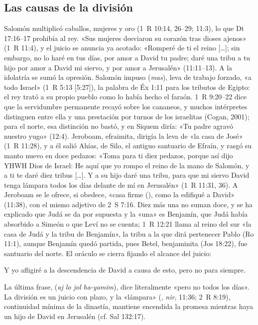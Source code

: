\subsection{Las causas de la división}
Salomón multiplicó caballos, mujeres y oro (1~R 10:14, 26--29; 11:3), lo que Dt 17:16--17 prohibía al rey. «Sus mujeres desviaron su corazón tras dioses ajenos» (1~R 11:4), y el juicio se anuncia ya acotado: «Romperé de ti el reino [\ldots]; sin embargo, no lo haré en tus días, por amor a David tu padre; daré una tribu a tu hijo por amor a David mi siervo, y por amor a Jerusalén» (11:11--13). A la idolatría se sumó la opresión. Salomón impuso  (\emph{mas}), leva de trabajo forzado, «a todo Israel» (1~R 5:13 [5:27]), la palabra de Éx 1:11 para los tributos de Egipto: el rey trató a su propio pueblo como lo había hecho el faraón. 1~R 9:20--22 dice que la servidumbre permanente recayó sobre los cananeos, y muchos intérpretes distinguen entre ella y una prestación por turnos de los israelitas (Cogan, 2001); para el norte, esa distinción no bastó, y en Siquem diría: «Tu padre agravó nuestro yugo» (12:4). Jeroboam, efraimita, dirigía la leva de «la casa de José» (1~R 11:28), y a él salió Ahías, de Silo, el antiguo santuario de Efraín, y rasgó su manto nuevo en doce pedazos: «Toma para ti diez pedazos, porque así dijo YHWH Dios de Israel: He aquí que yo rompo el reino de la mano de Salomón, y a ti te daré diez tribus [\ldots]. Y a su hijo daré una tribu, para que mi siervo David tenga lámpara todos los días delante de mí en Jerusalén» (1~R 11:31, 36). A Jeroboam se le ofrece, si obedece, «casa firme (), como la edifiqué a David» (11:38), con el mismo adjetivo de 2~S 7:16. Diez más una no suman doce, y se ha explicado que Judá se da por supuesta y la «una» es Benjamín, que Judá había absorbido a Simeón o que Leví no se cuenta; 1~R 12:21 llama al reino del sur «la casa de Judá y la tribu de Benjamín», la tribu a la que dirá pertenecer Pablo (Ro 11:1), aunque Benjamín quedó partida, pues Betel, benjaminita (Jos 18:22), fue santuario del norte. El oráculo se cierra fijando el alcance del juicio:

\begin{cita}Y yo afligiré a la descendencia de David a causa de esto, pero no para siempre.\end{cita}

La última frase,  (\emph{aj lo jol ha-yamim}), dice literalmente «pero no todos los días». La división es un juicio con plazo, y la «lámpara» (, \emph{nir}, 11:36; 2~R 8:19), continuidad mínima de la dinastía, mantiene encendida la promesa mientras haya un hijo de David en Jerusalén (cf. Sal 132:17).

